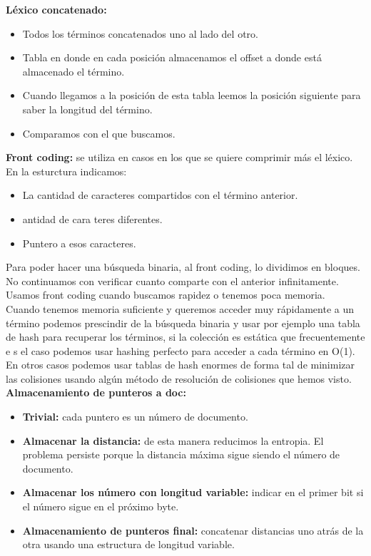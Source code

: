 \documentclass[titlepage,a4paper]{article}
\begin{document}
\textbf{Léxico concatenado:} 
\begin{itemize}
\item Todos los términos concatenados uno al lado del otro. 
\item Tabla en donde en cada posición almacenamos el offset a donde está almacenado el término. 
\item Cuando llegamos a la posición de esta tabla leemos la posición siguiente para saber la longitud del término. 
\item Comparamos con el que buscamos. 
\end{itemize}

\textbf{Front coding:} se utiliza en casos en los que se quiere comprimir más el léxico. En la esturctura indicamos: 
\begin{itemize}
\item La cantidad de caracteres compartidos con el término anterior. 
\item antidad de cara teres diferentes. 
\item Puntero a esos caracteres. 
\end{itemize}

Para poder hacer una búsqueda binaria, al front coding, lo dividimos en bloques. No continuamos con verificar cuanto comparte con el anterior infinitamente. \\

Usamos front coding cuando buscamos rapidez o tenemos poca memoria. \\

Cuando tenemos memoria suficiente y queremos acceder muy rápidamente a un término podemos prescindir de la búsqueda binaria y usar por ejemplo una tabla de hash para recuperar los términos, si la colección es estática que frecuentemente e s el caso podemos usar hashing perfecto para acceder a cada término en O(1). En otros casos podemos usar tablas de hash enormes de forma tal de minimizar las colisiones usando algún método de resolución de colisiones que hemos visto. \\

\textbf{Almacenamiento de punteros a doc:}\\
\begin{itemize}
\item \textbf{Trivial:} cada puntero es un número de documento. 
\item \textbf{Almacenar la distancia:} de esta manera reducimos la entropia. El problema persiste porque la distancia máxima sigue siendo el  número de documento. 
\item \textbf{Almacenar los número con longitud variable:} indicar en el primer bit si el número sigue en el próximo byte. 
\item \textbf{Almacenamiento de punteros final: } concatenar distancias uno atrás de la otra usando una estructura de longitud variable. 
\end{itemize}
\end{document}
